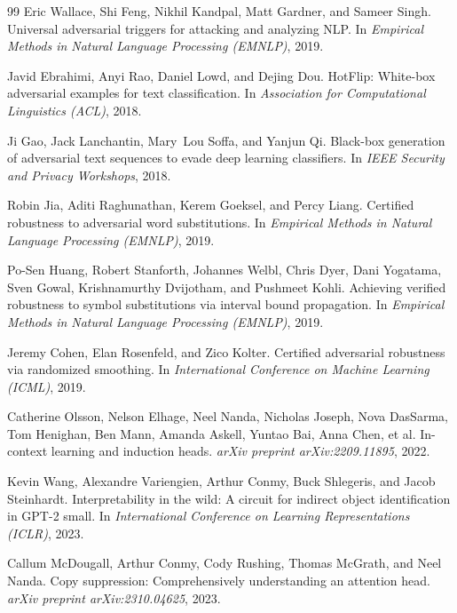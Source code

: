 \documentclass[10pt,twocolumn]{article}
\begin{document}
\begin{thebibliography}{99}
Eric Wallace, Shi Feng, Nikhil Kandpal, Matt Gardner, and Sameer Singh.
\newblock Universal adversarial triggers for attacking and analyzing NLP.
\newblock In \emph{Empirical Methods in Natural Language Processing (EMNLP)}, 2019.

Javid Ebrahimi, Anyi Rao, Daniel Lowd, and Dejing Dou.
\newblock HotFlip: White-box adversarial examples for text classification.
\newblock In \emph{Association for Computational Linguistics (ACL)}, 2018.

Ji Gao, Jack Lanchantin, Mary~Lou Soffa, and Yanjun Qi.
\newblock Black-box generation of adversarial text sequences to evade deep learning classifiers.
\newblock In \emph{IEEE Security and Privacy Workshops}, 2018.

Robin Jia, Aditi Raghunathan, Kerem Goeksel, and Percy Liang.
\newblock Certified robustness to adversarial word substitutions.
\newblock In \emph{Empirical Methods in Natural Language Processing (EMNLP)}, 2019.

Po-Sen Huang, Robert Stanforth, Johannes Welbl, Chris Dyer, Dani Yogatama, Sven Gowal, Krishnamurthy Dvijotham, and Pushmeet Kohli.
\newblock Achieving verified robustness to symbol substitutions via interval bound propagation.
\newblock In \emph{Empirical Methods in Natural Language Processing (EMNLP)}, 2019.

Jeremy Cohen, Elan Rosenfeld, and Zico Kolter.
\newblock Certified adversarial robustness via randomized smoothing.
\newblock In \emph{International Conference on Machine Learning (ICML)}, 2019.

Catherine Olsson, Nelson Elhage, Neel Nanda, Nicholas Joseph, Nova DasSarma, Tom Henighan, Ben Mann, Amanda Askell, Yuntao Bai, Anna Chen, et al.
\newblock In-context learning and induction heads.
\newblock \emph{arXiv preprint arXiv:2209.11895}, 2022.

Kevin Wang, Alexandre Variengien, Arthur Conmy, Buck Shlegeris, and Jacob Steinhardt.
\newblock Interpretability in the wild: A circuit for indirect object identification in GPT-2 small.
\newblock In \emph{International Conference on Learning Representations (ICLR)}, 2023.

Callum McDougall, Arthur Conmy, Cody Rushing, Thomas McGrath, and Neel Nanda.
\newblock Copy suppression: Comprehensively understanding an attention head.
\newblock \emph{arXiv preprint arXiv:2310.04625}, 2023.


\end{thebibliography}
\end{document}
